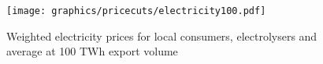 \begin{figure}[h!]
    \centering
    \texttt{[image: graphics/pricecuts/electricity100.pdf]}
    \caption{Weighted electricity prices for local consumers, electrolysers and average at 100 TWh export volume}
    \label{fig:pricecut}
\end{figure}



